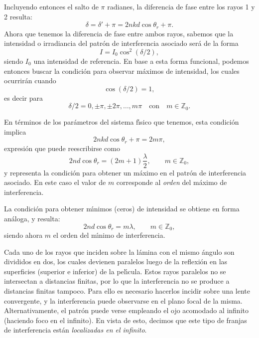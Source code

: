 \documentclass[a4paper]{article}
\newcommand{\Z}{\mathbb{Z}}
\begin{document}
Incluyendo entonces el salto de $\pi$ radianes, la diferencia de fase entre 
los rayos 1 y 2 resulta:
\begin{equation}
\delta = \delta' + \pi = 2 n k d \cos \theta_r + \pi.
\end{equation}
Ahora que tenemos la diferencia de fase entre ambos rayos, sabemos que la
intensidad o irradiancia del patr\'on de interferencia asociado ser\'a de 
la forma 
\begin{equation}
    I = I_0 \cos^2 (\delta/2),
\end{equation}
siendo $I_0$ una intensidad de referencia. En base a esta forma funcional, 
podemos entonces buscar la condici\'on para observar m\'aximos de intensidad, 
los cuales ocurrir\'an cuando
\begin{equation*}
    \cos (\delta/2) = 1,
\end{equation*}
es decir para 
\begin{equation*}
    \delta/2 = 0, \pm \pi, \pm 2\pi, \ldots, m \pi \quad \text{con} \quad
    m \in \Z_0. 
\end{equation*}

En t\'erminos de los par\'ametros del sistema f\'\i sico que tenemos, esta
condici\'on implica
\begin{equation*}
2 n k d \cos \theta_r + \pi = 2 m \pi, 
\end{equation*}
expresi\'on que puede reescribirse como
\begin{equation}
    2 n d \cos \theta_r = \left( 2 m + 1 \right) \frac{\lambda}{2}, \quad
    \quad m \in \Z_0,
\end{equation}
y representa la condici\'on para obtener un m\'aximo en el patr\'on de 
interferencia asociado. En este caso el valor de $m$ corresponde al {\it
orden} del m\'aximo de interferencia.

La condici\'on para obtener m\'\i nimos (ceros) de intensidad se obtiene en 
forma an\'aloga, y resulta:
\begin{equation}
    2 n d \cos \theta_r = m \lambda, \quad \quad m \in \Z_0,
\end{equation}
siendo ahora $m$ el orden del m\'\i nimo de interferencia.

Cada uno de los rayos que inciden sobre la l\'amina con el mismo \'angulo son 
divididos en dos, los cuales devienen paralelos luego de la reflexi\'on en 
las superficies (superior e inferior) de la pel\'\i cula. Estos rayos paralelos
no se intersectan a distancias finitas, por lo que la interferencia no se 
produce a distancias finitas tampoco. Para ello es necesario hacerlos incidir
sobre una lente convergente, y la interferencia puede observarse en el plano
focal de la misma. Alternativamente, el patr\'on puede verse empleando el 
ojo acomodado al infinito (haciendo foco en el infinito). En vista de esto,
decimos que este tipo de franjas de interferencia est\'an {\it localizadas
en el infinito}.
\end{document}
